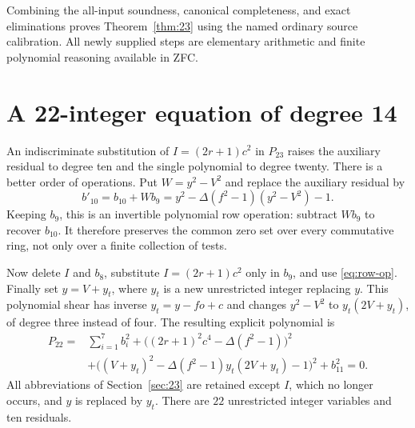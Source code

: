 \documentclass[11pt]{article}
\begin{document}
Combining the all-input soundness, canonical completeness, and exact
eliminations proves Theorem~\ref{thm:23} using the named ordinary source
calibration. All newly supplied steps are elementary arithmetic and finite
polynomial reasoning available in ZFC.

\section{A 22-integer equation of degree 14}
\label{sec:22}
An indiscriminate substitution of $I=(2r+1)c^2$ in $P_{23}$ raises the
auxiliary residual to degree ten and the single polynomial to degree twenty.
There is a better order of operations.
Put $W=y^2-V^2$ and replace the auxiliary residual by
\begin{equation}\label{eq:row-op}
 b'_{10}=b_{10}+Wb_9
 =y^2-\Delta(f^2-1)(y^2-V^2)-1.
\end{equation}
Keeping $b_9$, this is an invertible polynomial row operation: subtract
$Wb_9$ to recover $b_{10}$. It therefore preserves the common zero set
over every commutative ring, not only over a finite collection of tests.

Now delete $I$ and $b_8$, substitute $I=(2r+1)c^2$ only in $b_9$, and use
\eqref{eq:row-op}. Finally set $y=V+y_t$, where $y_t$ is a new unrestricted
integer replacing $y$. This polynomial shear has inverse $y_t=y-fo+c$
and changes $y^2-V^2$ to $y_t(2V+y_t)$, of degree three instead of four.
The resulting explicit polynomial is
\begin{equation}\label{eq:P22}
\boxed{\begin{aligned}
 P_{22}={}&\sum_{i=1}^{7}b_i^2+
 \bigl((2r+1)^2c^4-\Delta(f^2-1)\bigr)^2\\
 &+\bigl((V+y_t)^2-\Delta(f^2-1)y_t(2V+y_t)-1\bigr)^2+b_{11}^2=0.
\end{aligned}}
\end{equation}
All abbreviations of Section~\ref{sec:23} are retained except $I$, which
no longer occurs, and $y$ is replaced by $y_t$. There are $22$ unrestricted
integer variables and ten residuals.
\end{document}

